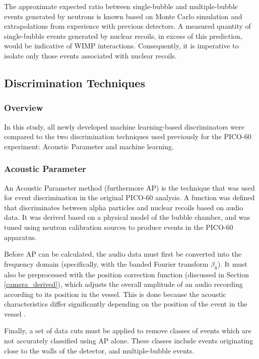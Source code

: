 \documentclass[10pt]{article}
\begin{document}
The approximate expected ratio between single-bubble and multiple-bubble events generated by neutrons is known based on Monte Carlo simulation and extrapolations from experience with previous detectors. A measured quantity of single-bubble events generated by nuclear recoils, in excess of this prediction, would be indicative of WIMP interactions. Consequently, it is imperative to isolate only those events associated with nuclear recoils.

\subsection{Discrimination Techniques}

\subsubsection{Overview}

In this study, all newly developed machine learning-based discriminators were compared to the two discrimination techniques used previously for the PICO-60 experiment: Acoustic Parameter and machine learning.

\subsubsection{Acoustic Parameter}

An Acoustic Parameter method (furthermore AP) is the technique that was used for event discrimination in the original PICO-60 analysis. A function was defined that discriminates between alpha particles and nuclear recoils based on audio data. It was derived based on a physical model of the bubble chamber, and was tuned using neutron calibration sources to produce events in the PICO-60 apparatus.

Before AP can be calculated, the audio data must first be converted into the frequency domain (specifically, with the banded Fourier transform $\beta_{8}$). It must also be preprocessed with the position correction function (discussed in Section \ref{camera_derived}), which adjusts the overall amplitude of an audio recording according to its position in the vessel. This is done because the acoustic characteristics differ significantly depending on the position of the event in the vessel \cite{pico}.

Finally, a set of data cuts must be applied to remove classes of events which are not accurately classified using AP alone. These classes include events originating close to the walls of the detector, and multiple-bubble events.
\end{document}
